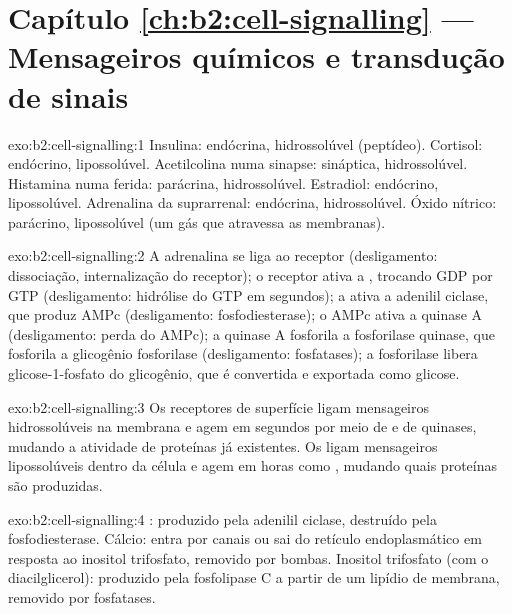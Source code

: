 \section*{Capítulo \ref{ch:b2:cell-signalling} --- Mensageiros químicos e transdução de sinais}

\begin{solution}{exo:b2:cell-signalling:1}
Insulina: endócrina, hidrossolúvel (peptídeo). Cortisol: endócrino,
lipossolúvel. Acetilcolina numa sinapse: sináptica, hidrossolúvel.
Histamina numa ferida: parácrina, hidrossolúvel. Estradiol: endócrino,
lipossolúvel. Adrenalina da suprarrenal: endócrina, hidrossolúvel.
Óxido nítrico: parácrino, lipossolúvel (um gás que atravessa as
membranas).
\end{solution}

\begin{solution}{exo:b2:cell-signalling:2}
A adrenalina se liga ao receptor (desligamento: dissociação,
internalização do receptor); o receptor ativa a , trocando GDP
por GTP (desligamento: hidrólise do GTP em segundos); a  ativa
a adenilil ciclase, que produz AMPc (desligamento: fosfodiesterase); o
AMPc ativa a quinase A (desligamento: perda do AMPc); a quinase A
fosforila a fosforilase quinase, que fosforila a glicogênio fosforilase
(desligamento: fosfatases); a fosforilase libera glicose-1-fosfato do
glicogênio, que é convertida e exportada como glicose.
\end{solution}

\begin{solution}{exo:b2:cell-signalling:3}
Os receptores de superfície ligam mensageiros hidrossolúveis na
membrana e agem em segundos por meio de  e de
quinases, mudando a atividade de proteínas já existentes. Os  ligam mensageiros lipossolúveis dentro da célula e agem em
horas como , mudando quais proteínas são
produzidas.
\end{solution}

\begin{solution}{exo:b2:cell-signalling:4}
: produzido pela adenilil ciclase, destruído pela
fosfodiesterase. Cálcio: entra por canais ou sai do retículo
endoplasmático em resposta ao inositol trifosfato, removido por bombas.
Inositol trifosfato (com o diacilglicerol): produzido pela fosfolipase C
a partir de um lipídio de membrana, removido por fosfatases.
\end{solution}

